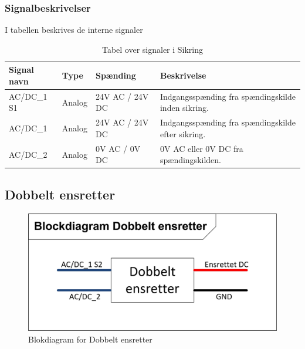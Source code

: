 \subsubsection{Signalbeskrivelser}
I tabellen beskrives de interne signaler
\begin{table}[H]
\begin{tabular}{|p{3cm}|p{3cm}|p{3cm}|p{4.5cm}|} \hline
\cellcolor[gray]{0.85}Signal navn& \cellcolor[gray]{0.85}Type &\cellcolor[gray]{0.85}Spænding&\cellcolor[gray]{0.85}Beskrivelse\\ \hline
AC/DC\_1 S1 & Analog  & 24V AC / 24V DC & Indgangsspænding fra spændingskilde inden sikring.\\  \hline
AC/DC\_1   & Analog & 24V AC / 24V DC & Indgangsspænding fra spændingskilde efter sikring. \\  \hline
AC/DC\_2 & Analog & 0V AC / 0V DC & 0V AC eller 0V DC fra spændingskilden.\\  \hline

\end{tabular}
\caption{Tabel over signaler i Sikring}
\label{table:SikringSignaler}
\end{table}
\newpage
\subsection{Dobbelt ensretter}
\begin{figure}[H]
\centering
\includegraphics[scale=1]{billeder/DobbeltensretterBlok}
\caption{Blokdiagram for Dobbelt ensretter}
\label{fig:DobbeltensretterBlok}
\end{figure}

